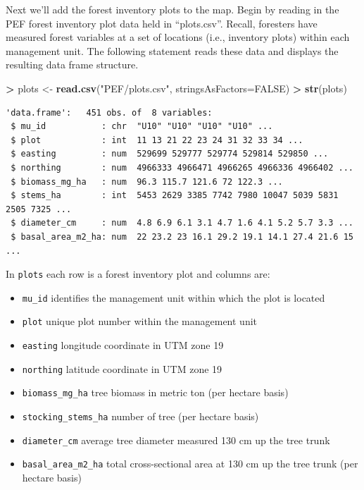 \documentclass[
]{krantz}
\makeatletter
\newenvironment{Shaded}{\begin{snugshade}}{\end{snugshade}}
\newcommand{\DataTypeTok}[1]{\textcolor[rgb]{0.27,0.27,0.27}{#1}}
\newcommand{\KeywordTok}[1]{\textcolor[rgb]{0.27,0.27,0.27}{\textbf{#1}}}
\newcommand{\NormalTok}[1]{#1}
\newcommand{\OperatorTok}[1]{\textcolor[rgb]{0.43,0.43,0.43}{\textbf{#1}}}
\newcommand{\OtherTok}[1]{\textcolor[rgb]{0.37,0.37,0.37}{#1}}
\newcommand{\StringTok}[1]{\textcolor[rgb]{0.5,0.5,0.5}{#1}}
\providecommand{\tightlist}{%
  \setlength{\itemsep}{0pt}\setlength{\parskip}{0pt}}
\newenvironment{kframe}{%
\medskip{}
\setlength{\fboxsep}{.8em}
 \def\at@end@of@kframe{}%
 \ifinner\ifhmode%
  \def\at@end@of@kframe{\end{minipage}}%
  \begin{minipage}{\columnwidth}%
 \fi\fi%
 \def\FrameCommand##1{\hskip\@totalleftmargin \hskip-\fboxsep
 \colorbox{shadecolor}{##1}\hskip-\fboxsep
     \hskip-\linewidth \hskip-\@totalleftmargin \hskip\columnwidth}%
 \MakeFramed {\advance\hsize-\width
   \@totalleftmargin\z@ \linewidth\hsize
   \@setminipage}}%
 {\par\unskip\endMakeFramed%
 \at@end@of@kframe}
\renewenvironment{Shaded}{\begin{kframe}}{\end{kframe}}
\makeatother
\begin{document}
Next we'll add the forest inventory plots to the map. Begin by reading in the PEF forest inventory plot data held in ``plots.csv''. Recall, foresters have measured forest variables at a set of locations (i.e., inventory plots) within each management unit. The following statement reads these data and displays the resulting data frame structure.

\begin{Shaded}
\begin{Highlighting}[]
\OperatorTok{\textgreater{}}\StringTok{ }\NormalTok{plots \textless{}{-}}\StringTok{ }\KeywordTok{read.csv}\NormalTok{(}\StringTok{"PEF/plots.csv"}\NormalTok{, }\DataTypeTok{stringsAsFactors=}\OtherTok{FALSE}\NormalTok{)}
\OperatorTok{\textgreater{}}\StringTok{ }\KeywordTok{str}\NormalTok{(plots)}
\end{Highlighting}
\end{Shaded}

\begin{verbatim}
'data.frame':   451 obs. of  8 variables:
 $ mu_id           : chr  "U10" "U10" "U10" "U10" ...
 $ plot            : int  11 13 21 22 23 24 31 32 33 34 ...
 $ easting         : num  529699 529777 529774 529814 529850 ...
 $ northing        : num  4966333 4966471 4966265 4966336 4966402 ...
 $ biomass_mg_ha   : num  96.3 115.7 121.6 72 122.3 ...
 $ stems_ha        : int  5453 2629 3385 7742 7980 10047 5039 5831 2505 7325 ...
 $ diameter_cm     : num  4.8 6.9 6.1 3.1 4.7 1.6 4.1 5.2 5.7 3.3 ...
 $ basal_area_m2_ha: num  22 23.2 23 16.1 29.2 19.1 14.1 27.4 21.6 15 ...
\end{verbatim}

In \texttt{plots} each row is a forest inventory plot and columns are:

\begin{itemize}
\tightlist
\item
  \texttt{mu\_id} identifies the management unit within which the plot is located
\item
  \texttt{plot} unique plot number within the management unit
\item
  \texttt{easting} longitude coordinate in UTM zone 19
\item
  \texttt{northing} latitude coordinate in UTM zone 19
\item
  \texttt{biomass\_mg\_ha} tree biomass in metric ton (per hectare basis)
\item
  \texttt{stocking\_stems\_ha} number of tree (per hectare basis)
\item
  \texttt{diameter\_cm} average tree diameter measured 130 cm up the tree trunk
\item
  \texttt{basal\_area\_m2\_ha} total cross-sectional area at 130 cm up the tree trunk (per hectare basis)
\end{itemize}
\end{document}
